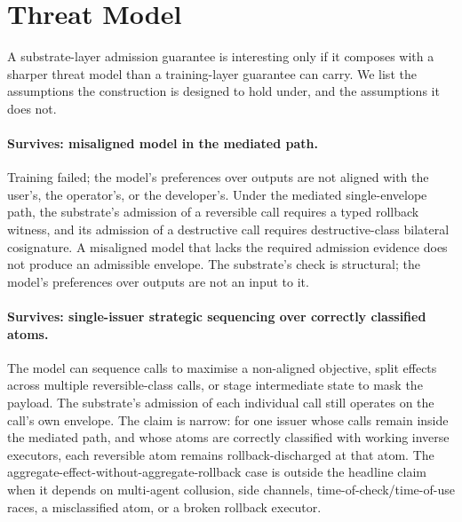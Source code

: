 \section{Threat Model}
\label{sec:threat}

A substrate-layer admission guarantee is interesting only if it composes with a sharper threat model than a training-layer guarantee can carry. We list the assumptions the construction is designed to hold under, and the assumptions it does not.

\paragraph{Survives: misaligned model in the mediated path.}
Training failed; the model's preferences over outputs are not aligned with the user's, the operator's, or the developer's. Under the mediated single-envelope path, the substrate's admission of a reversible call requires a typed rollback witness, and its admission of a destructive call requires destructive-class bilateral cosignature. A misaligned model that lacks the required admission evidence does not produce an admissible envelope. The substrate's check is structural; the model's preferences over outputs are not an input to it.

\paragraph{Survives: single-issuer strategic sequencing over correctly classified atoms.}
The model can sequence calls to maximise a non-aligned objective, split effects across multiple reversible-class calls, or stage intermediate state to mask the payload. The substrate's admission of each individual call still operates on the call's own envelope. The claim is narrow: for one issuer whose calls remain inside the mediated path, and whose atoms are correctly classified with working inverse executors, each reversible atom remains rollback-discharged at that atom. The aggregate-effect-without-aggregate-rollback case is outside the headline claim when it depends on multi-agent collusion, side channels, time-of-check/time-of-use races, a misclassified atom, or a broken rollback executor.

